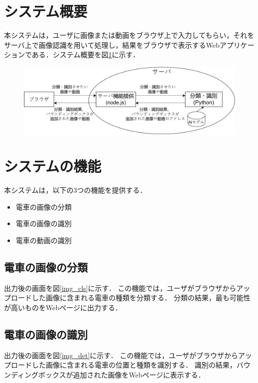 \begin{multicols*}{2}
\section{システム概要}
本システムは，ユーザに画像または動画をブラウザ上で入力してもらい，それをサーバ上で画像認識を用いて処理し，結果をブラウザで表示するWebアプリケーションである．システム概要を図\ref{abc}に示す．
\begin{figure} %
	\label{abc}
	\centering
	\includegraphics[width=\linewidth]{obj/sys_gaiyou6.pdf}
\end{figure}

\section{システムの機能}
本システムは，以下の3つの機能を提供する．
\begin{itemize}
	\item 電車の画像の分類
	\item 電車の画像の識別
	\item 電車の動画の識別
\end{itemize}

\subsection{電車の画像の分類} 
出力後の画面を図\ref{img_cls}に示す．
この機能では，ユーザがブラウザからアップロードした画像に含まれる電車の種類を分類する． 分類の結果，最も可能性が高いものをWebページに出力する．
\subsection{電車の画像の識別}
出力後の画面を図\ref{img_det}に示す．
この機能では，ユーザがブラウザからアップロードした画像に含まれる電車の位置と種類を識別する．  識別の結果，バウンディングボックスが追加された画像をWebページに表示する．

\end{multicols*}
